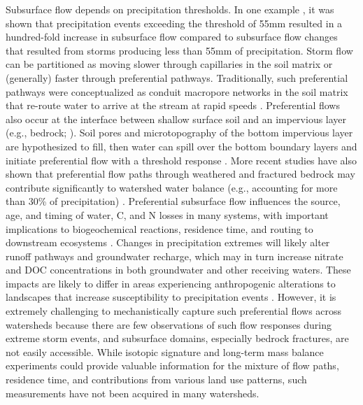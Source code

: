 \documentclass[preprint,review, 12pt]{elsarticle}
\begin{document}
Subsurface flow depends on precipitation thresholds. In one example \citep{Tromp-vanMeerveld2006}, it was shown that precipitation events exceeding the threshold of 55mm resulted in a hundred-fold increase in subsurface flow compared to subsurface flow changes that resulted from storms producing less than 55mm of precipitation. Storm flow can be partitioned as moving slower through capillaries in the soil matrix or (generally) faster through preferential pathways. Traditionally, such preferential pathways were conceptualized as conduit macropore networks in the soil matrix that re-route water to arrive at the stream at rapid speeds \citep{Beven1982}. Preferential flows also occur at the interface between shallow surface soil and an impervious layer (e.g., bedrock; \citealp{Freer2002, Graham2010, Hopp2009, Lehmann2007, McGlynn2003, Salve2012, Tani1997, Tromp-vanMeerveld2006a}). Soil pores and microtopography of the bottom impervious layer are hypothesized to fill, then water can spill over the bottom boundary layers and initiate preferential flow with a threshold response \citep{Tromp-vanMeerveld2006a}. More recent studies have also shown that preferential flow paths through weathered and fractured bedrock may contribute significantly to watershed water balance (e.g., accounting for more than 30\% of precipitation) \citep{Kosugi2006, Graham2010, Aishlin2011, Flinchum2018, Tromp-vanMeerveld2007}. Preferential subsurface flow influences the source, age, and timing of water, C, and N losses in many systems, with important implications to biogeochemical reactions, residence time, and routing to downstream ecosystems \citep{Lohse2009}. Changes in precipitation extremes will likely alter runoff pathways and groundwater recharge, which may in turn increase nitrate and DOC concentrations in both groundwater and other receiving waters. These impacts are likely to differ in areas experiencing anthropogenic alterations to landscapes that increase susceptibility to precipitation events \citep{Walsh2005, Burns2012}. However, it is extremely challenging to mechanistically  capture such preferential flows across watersheds because there are few observations of such flow responses during extreme storm events, and subsurface domains, especially bedrock fractures, are not easily accessible. While isotopic signature and long-term mass balance experiments could provide valuable information for the mixture of flow paths, residence time, and contributions from various land use patterns, such measurements have not been acquired in many watersheds.
\end{document}

